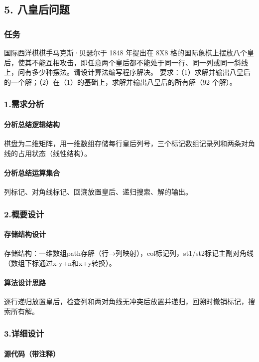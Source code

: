 \documentclass{ctexart}
\begin{document}
\subsection{5. 八皇后问题}
\subsubsection{任务}
国际西洋棋棋手马克斯·贝瑟尔于 1848 年提出在 8X8 格的国际象棋上摆放八个皇后，使其不能互相攻击，即任意两个皇后都不能处于同一行、同一列或同一斜线上，问有多少种摆法。请设计算法编写程序解决。
要求：（1）求解并输出八皇后的一个解；（2）在（1）的基础上，求解并输出八皇后的所有解（92 个解）。

\subsubsection{1.需求分析}
\paragraph{分析总结逻辑结构}
棋盘为二维矩阵，用一维数组存储每行皇后列号，三个标记数组记录列和两条对角线的占用状态（线性结构）。
\paragraph{分析总结运算集合}
列标记、对角线标记、回溯放置皇后、递归搜索、解的输出。

\subsubsection{2.概要设计}
\paragraph{存储结构设计}
存储结构：一维数组path存解（行→列映射），col标记列，st1/st2标记主副对角线（数组下标通过x-y+n和x+y转换）。
\paragraph{算法设计思路}
逐行递归放置皇后，检查列和两对角线无冲突后放置并递归，回溯时撤销标记，搜索所有解。

\subsubsection{3.详细设计}
\paragraph{源代码（带注释）}
\end{document}
